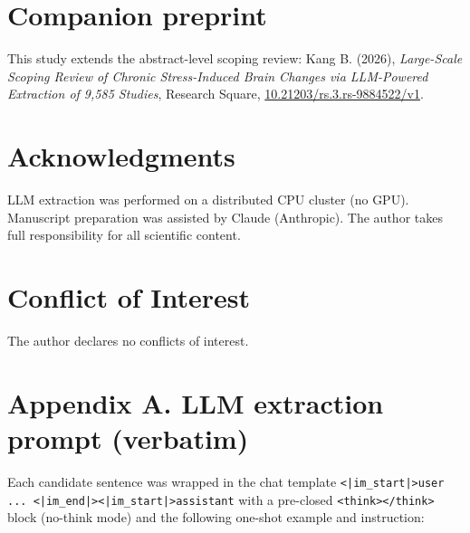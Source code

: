 \documentclass[11pt]{article}
\begin{document}
\section*{Companion preprint}
This study extends the abstract-level scoping review:
Kang B. (2026), \emph{Large-Scale Scoping Review of Chronic Stress-Induced Brain
Changes via LLM-Powered Extraction of 9,585 Studies}, Research Square,
\href{https://doi.org/10.21203/rs.3.rs-9884522/v1}{10.21203/rs.3.rs-9884522/v1}.

\section*{Acknowledgments}
LLM extraction was performed on a distributed CPU cluster (no GPU). Manuscript
preparation was assisted by Claude (Anthropic). The author takes full
responsibility for all scientific content.

\section*{Conflict of Interest}
The author declares no conflicts of interest.

\appendix
\section*{Appendix A. LLM extraction prompt (verbatim)}
Each candidate sentence was wrapped in the chat template
\texttt{<|im\_start|>user ... <|im\_end|><|im\_start|>assistant} with a
pre-closed \texttt{<think></think>} block (no-think mode) and the following
one-shot example and instruction:
\end{document}
